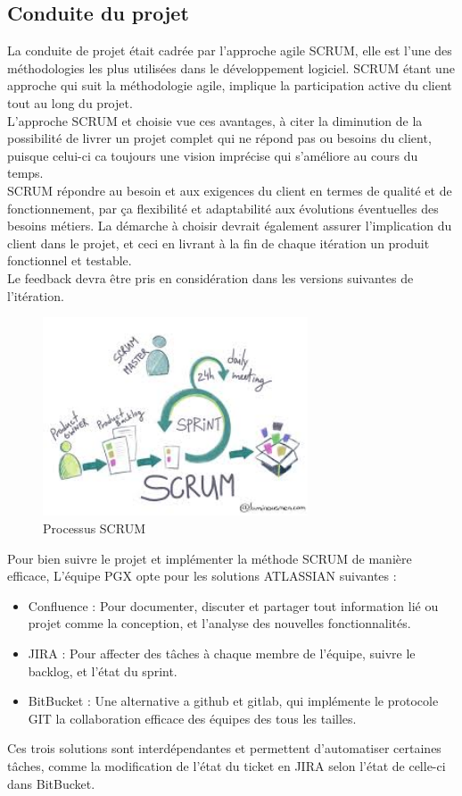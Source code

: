 \subsection{Conduite du projet}
La conduite de projet était cadrée par l’approche agile SCRUM, elle est l’une des méthodologies les plus utilisées dans le développement logiciel. SCRUM étant une approche qui suit la méthodologie agile, implique la participation active du client tout au long du projet.\\
L’approche SCRUM et choisie vue ces avantages, à citer la diminution de la possibilité de livrer un projet complet qui ne répond pas ou besoins du client, puisque celui-ci ca toujours une vision imprécise qui s’améliore au cours du temps.\\
SCRUM répondre au besoin et aux exigences du client en termes de qualité et de fonctionnement, par ça flexibilité et adaptabilité aux évolutions éventuelles des besoins métiers. La démarche à choisir devrait également assurer l’implication du client dans le projet, et ceci en livrant à la fin de chaque itération un produit fonctionnel et testable.\\
Le feedback devra être pris en considération dans les versions suivantes de l’itération.\\

\begin{figure}[h!]  
  \centering
    \includegraphics[width=0.7\textwidth]{chapitre1/Figures/SCRUM.jpg}
  \caption{Processus SCRUM}
\end{figure}

Pour bien suivre le projet et implémenter la méthode SCRUM de manière efficace, L’équipe PGX opte pour les solutions ATLASSIAN suivantes :
\begin{itemize}
\item Confluence : Pour documenter, discuter et partager tout information lié ou projet comme la conception, et l’analyse des nouvelles fonctionnalités. 
\item JIRA : Pour affecter des tâches à chaque membre de l’équipe, suivre le backlog, et l’état du sprint.
\item BitBucket : Une alternative a github et gitlab, qui implémente le protocole GIT la collaboration efficace des équipes des tous les tailles.
\end{itemize}
Ces trois solutions sont interdépendantes et permettent d’automatiser certaines tâches, comme la modification de l’état du ticket en JIRA selon l’état de celle-ci dans BitBucket.\\

